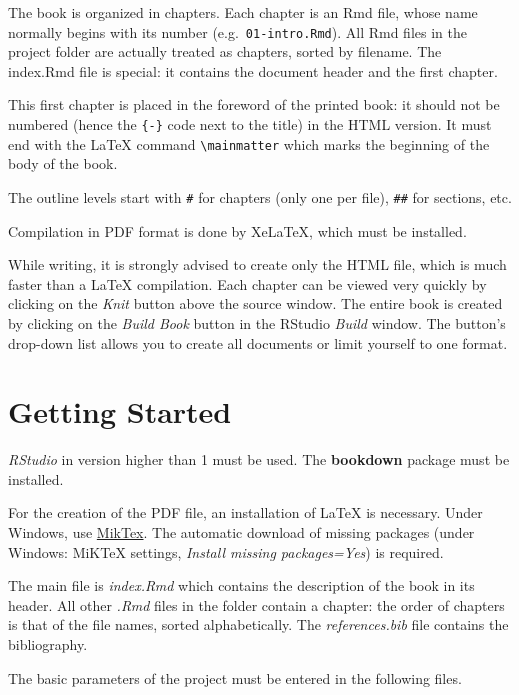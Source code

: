 \documentclass[
  12pt,
  american,
  a4paper,
  extrafontsizes,onecolumn,openright
  ]{memoir}
\begin{document}
\normalsize

The book is organized in chapters.
Each chapter is an Rmd file, whose name normally begins with its number (e.g.~\texttt{01-intro.Rmd}).
All Rmd files in the project folder are actually treated as chapters, sorted by filename.
The index.Rmd file is special: it contains the document header and the first chapter.

This first chapter is placed in the foreword of the printed book: it should not be numbered (hence the \texttt{\{-\}} code next to the title) in the HTML version.
It must end with the LaTeX command \texttt{\textbackslash{}mainmatter} which marks the beginning of the body of the book.

The outline levels start with \texttt{\#} for chapters (only one per file), \texttt{\#\#} for sections, etc.

Compilation in PDF format is done by XeLaTeX, which must be installed.

While writing, it is strongly advised to create only the HTML file, which is much faster than a LaTeX compilation.
Each chapter can be viewed very quickly by clicking on the \emph{Knit} button above the source window.
The entire book is created by clicking on the \emph{Build Book} button in the RStudio \emph{Build} window.
The button's drop-down list allows you to create all documents or limit yourself to one format.

\mainmatter

\hypertarget{getting_started}{%
\chapter{Getting Started}\label{getting_started}}

\emph{RStudio} in version higher than 1 must be used.
The \textbf{bookdown} package must be installed.

For the creation of the PDF file, an installation of LaTeX is necessary.
Under Windows, use \href{https://miktex.org/download}{MikTex}.
The automatic download of missing packages (under Windows: MiKTeX settings, \emph{Install missing packages=Yes}) is required.

The main file is \emph{index.Rmd} which contains the description of the book in its header.
All other \emph{.Rmd} files in the folder contain a chapter: the order of chapters is that of the file names, sorted alphabetically.
The \emph{references.bib} file contains the bibliography.

The basic parameters of the project must be entered in the following files.
\end{document}
